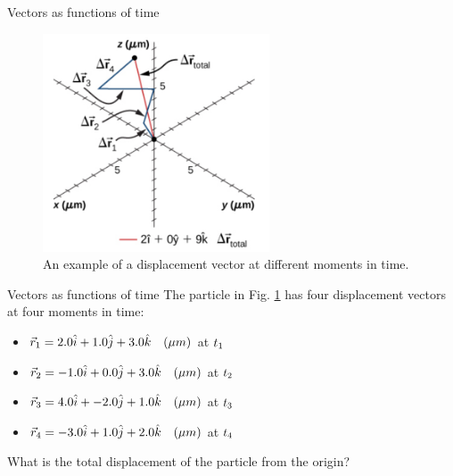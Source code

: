 \documentclass{beamer}
\begin{document}
\begin{frame}{Vectors as functions of time}
\begin{figure}
\centering
\includegraphics[width=0.6\textwidth,trim=0cm 2cm 0cm 0cm,clip=true]{figures/Brownian.png}
\caption{\label{fig:brown} An example of a displacement vector at different moments in time.}
\end{figure}
\end{frame}

\begin{frame}{Vectors as functions of time}
The particle in Fig. \ref{fig:brown} has four displacement vectors at four moments in time:
\begin{itemize}
\item $\vec{r}_{\rm 1} = 2.0\hat{i} + 1.0\hat{j} + 3.0\hat{k}\quad(\mu m)$ at $t_{\rm 1}$
\item $\vec{r}_{\rm 2} = -1.0\hat{i} + 0.0\hat{j} + 3.0\hat{k}\quad(\mu m)$ at $t_{\rm 2}$
\item $\vec{r}_{\rm 3} = 4.0\hat{i} + -2.0\hat{j} + 1.0\hat{k}\quad(\mu m)$ at $t_{\rm 3}$
\item $\vec{r}_{\rm 4} = -3.0\hat{i} + 1.0\hat{j} + 2.0\hat{k}\quad(\mu m)$ at $t_{\rm 4}$
\end{itemize}
What is the total displacement of the particle from the origin?
\end{frame}
\end{document}
